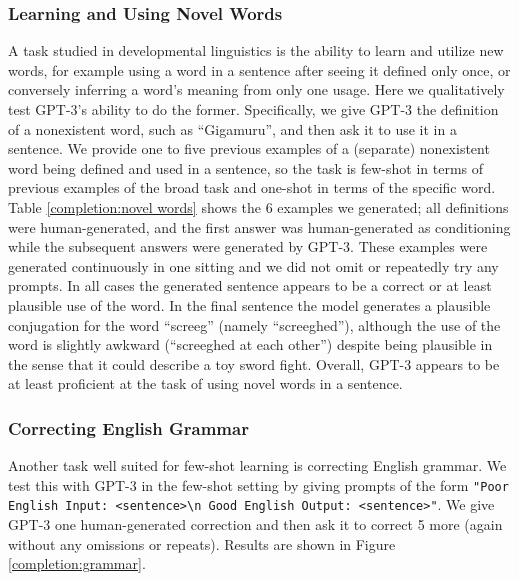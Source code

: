 \documentclass{article}
\begin{document}
        \subsubsection{Learning and Using Novel Words}
        \label{section:Learning_and_Using_Novel_Words}
A task studied in developmental linguistics \cite{carey1978acquiring} is the ability to learn and utilize new words, for example using a word in a sentence after seeing it defined only once, or conversely inferring a word’s meaning from only one usage.  Here we qualitatively test GPT-3’s ability to do the former.  Specifically, we give GPT-3 the definition of a nonexistent word, such as ``Gigamuru'', and then ask it to use it in a sentence.  We provide one to five previous examples of a (separate) nonexistent word being defined and used in a sentence, so the task is few-shot in terms of previous examples of the broad task and one-shot in terms of the specific word.  Table \ref{completion:novel words} shows the 6 examples we generated; all definitions were human-generated, and the first answer was human-generated as conditioning while the subsequent answers were generated by GPT-3.  These examples were generated continuously in one sitting and we did not omit or repeatedly try any prompts.  In all cases the generated sentence appears to be a correct or at least plausible use of the word.  In the final sentence the model generates a plausible conjugation for the word ``screeg'' (namely ``screeghed''), although the use of the word is slightly awkward (``screeghed at each other'') despite being plausible in the sense that it could describe a toy sword fight.  Overall, GPT-3 appears to be at least proficient at the task of using novel words in a sentence.

        \subsubsection{Correcting English Grammar}
        \label{section:Correcting_English_Grammar}
Another task well suited for few-shot learning is correcting English grammar.  We test this with GPT-3 in the few-shot setting by giving prompts of the form \texttt{"Poor English Input: <sentence>{\textbackslash}n Good English Output: <sentence>"}.  We give GPT-3 one human-generated correction and then ask it to correct 5 more (again without any omissions or repeats).  Results are shown in Figure \ref{completion:grammar}.
\end{document}
